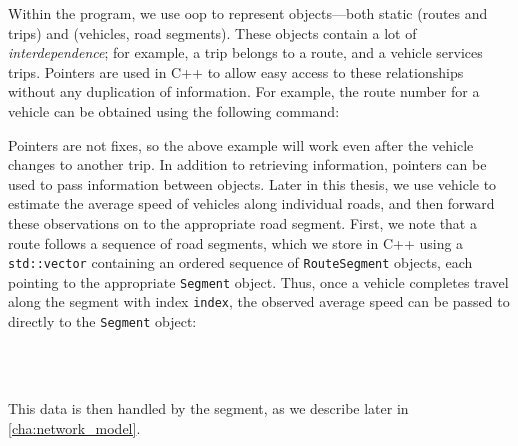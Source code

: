 Within the program, we use \gls{oop} to represent objects---both static (routes and trips) and \rt{} (vehicles, road segments). These objects contain a lot of \emph{interdependence}; for example, a trip belongs to a route, and a vehicle services trips. Pointers are used in C++ to allow easy access to these relationships without any duplication of information. For example, the route number for a vehicle can be obtained using the following command:
\begin{knitrout}\small
{}\color{fgcolor}\begin{kframe}
\noindent
\ttfamily
{}\hlstd{}\hlstd{}\hlopt{(){-}$>$}\hlstd{}\hlstd{}\hlopt{(){-}$>$}\hlstd{}\hlstd{}\hlopt{();}\hlstd{}\hspace*{\fill}
\mbox{}
\normalfont
\end{kframe}
\end{knitrout}
Pointers are not fixes, so the above example will work even after the vehicle changes to another trip. In addition to retrieving information, pointers can be used to pass information between objects. Later in this thesis, we use vehicle to estimate the average speed of vehicles along individual roads, and then forward these observations on to the appropriate road segment. First, we note that a route follows a sequence of road segments, which we store in C++ using a \verb+std::vector+ containing an ordered sequence of \verb+RouteSegment+ objects, each pointing to the appropriate \verb+Segment+ object. Thus, once a vehicle completes travel along the segment with index \verb+index+, the observed average speed can be passed to directly to the \verb+Segment+ object:
\begin{knitrout}\small
{}\color{fgcolor}\begin{kframe}
\noindent
\ttfamily
{}\hlstd{}\hlstd{}\hlopt{(){-}$>$}\hlstd{}\hlstd{}\hlopt{()}\hspace*{\fill}\\
\hlstd{}\hlstd{\ \ \ \ }\hlstd{}\hlopt{{-}$>$}\hlstd{}\hlstd{}\hlstd{}\hlstd{}\hlopt{(}\hlopt{){-}$>$}\hlstd{}\hlstd{}\hlopt{()}\hspace*{\fill}\\
\hlstd{}\hlstd{\ \ \ \ }\hlstd{}\hlopt{{-}$>$}\hlstd{}\hlstd{}\hlopt{(}\hlopt{,\ }\hlopt{);}\hlstd{}\hspace*{\fill}
\mbox{}
\normalfont
\end{kframe}
\end{knitrout}
This data is then handled by the segment, as we describe later in \cref{cha:network_model}.


